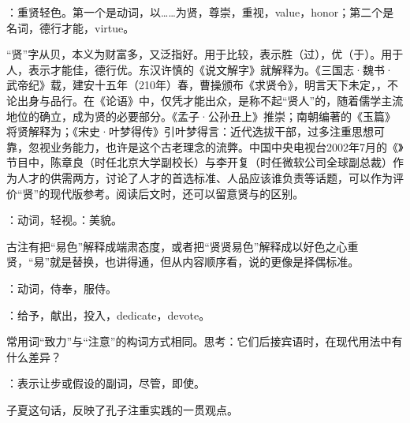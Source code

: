 {
\item {}：重贤轻色。第一个是动词，以……为贤，尊崇，重视，value，honor；第二个是名词，德行才能，virtue。

“贤”字从贝，本义为财富多，又泛指好。用于比较，表示胜（过），优（于）。用于人，表示才能佳，德行优。东汉许慎的《说文解字》就解释为。《三国志·魏书·武帝纪》载，建安十五年（210年）春，曹操颁布《求贤令》，明言天下未定，，不论出身与品行。在《论语》中，仅凭才能出众，是称不起“贤人”的，随着儒学主流地位的确立，成为贤的必要部分。《孟子·公孙丑上》推崇；南朝编著的《玉篇》将贤解释为；《宋史·叶梦得传》引叶梦得言：近代选拔干部，过多注重思想可靠，忽视业务能力，也许是这个古老理念的流弊。中国中央电视台2002年7月的《》节目中，陈章良（时任北京大学副校长）与李开复（时任微软公司全球副总裁）作为人才的供需两方，讨论了人才的首选标准、人品应该谁负责等话题，可以作为评价“贤”的现代版参考。阅读后文时，还可以留意贤与的区别。

：动词，轻视。：美貌。

古注有把“易色”解释成端肃态度，或者把“贤贤易色”解释成以好色之心重贤，“易”就是替换，也讲得通，但从内容顺序看，说的更像是择偶标准。

\item {}：动词，侍奉，服侍。

\item {}：给予，献出，投入，dedicate，devote。

常用词“致力”与“注意”的构词方式相同。思考：它们后接宾语时，在现代用法中有什么差异？
\item {}：表示让步或假设的副词，尽管，即使。

子夏这句话，反映了孔子注重实践的一贯观点。
}
{}


